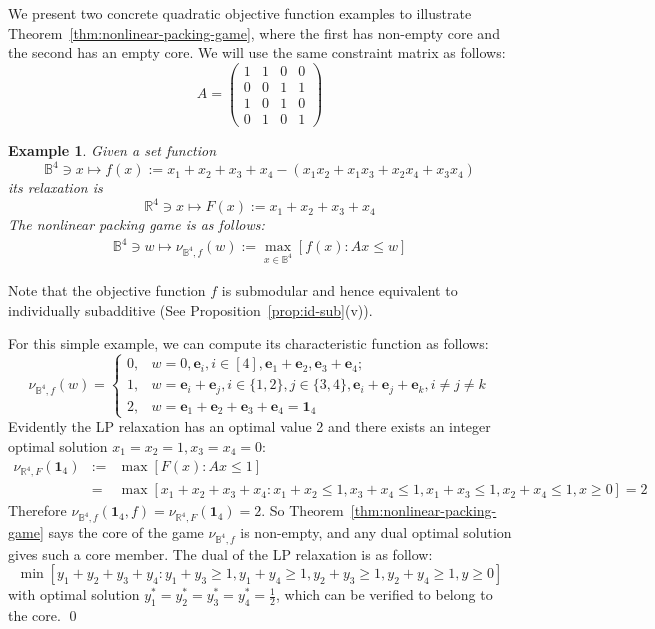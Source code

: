\documentclass[11pt]{article}\usepackage[]{graphicx}\usepackage[]{xcolor}
\newtheorem{example}{Example}
\begin{document}
We present two concrete quadratic objective function examples to illustrate Theorem~\ref{thm:nonlinear-packing-game}, where the first has non-empty core and the second has an empty core. We will use the same constraint matrix as follows:
\[
A=\begin{pmatrix}
1&1&0&0\\
0&0&1&1\\
1&0&1&0\\
0&1&0&1
\end{pmatrix}
\]
\begin{example} Given a set function
\[
\mathbb{B}^4\ni x\mapsto f(x):=x_1+x_2+x_3+x_4-(x_1x_2+x_1x_3+x_2x_4+x_3x_4)
\]
its relaxation is
\[
\mathbb{R}^4\ni x\mapsto F(x):=x_1+x_2+x_3+x_4
\]
The nonlinear packing game is as follows:
\begin{eqnarray*}
\mathbb{B}^4\ni w\mapsto \nu_{\mathbb{B}^4,f}(w):=\max_{x\in \mathbb{B}^4} [f(x): Ax\le w]
\end{eqnarray*}
\end{example}
Note that the objective function $f$ is submodular and hence equivalent to individually subadditive (See Proposition~\ref{prop:id-sub}(v)). 

For this simple example, we can compute its characteristic function as follows:
\[
\nu_{\mathbb{B}^4,f}(w)=
\begin{cases}
0, &w=0, \mathbf{e}_i, i\in [4], \mathbf{e}_1+\mathbf{e}_2, \mathbf{e}_3+\mathbf{e}_4;\\
1, & w= \mathbf{e}_i+\mathbf{e}_j, i\in \{1,2\}, j\in \{3,4\}, \mathbf{e}_i+\mathbf{e}_j+\mathbf{e}_k, i\ne j\ne k\\
2,  & w=\mathbf{e}_1+\mathbf{e}_2+\mathbf{e}_3+\mathbf{e}_4=\mathbf{1}_4
\end{cases}
\]
Evidently the LP relaxation has an optimal value 2 and there exists an integer optimal solution $x_1=x_2=1, x_3=x_4=0$:
\begin{eqnarray*}
\nu_{\mathbb{R}^4,F}\left(\mathbf{1}_4\right)&:=&\max [F(x): Ax\le 1]\\
&=&\max[x_1+x_2+x_3+x_4: x_1+x_2\le 1, x_3+x_4\le 1, x_1+x_3\le 1,  x_2+x_4\le 1, x\ge 0]=2
\end{eqnarray*}
Therefore $\nu_{\mathbb{B}^4,f}\left(\mathbf{1}_4,f\right)=\nu_{\mathbb{R}^4,F}\left(\mathbf{1}_4\right)=2$. So Theorem~\ref{thm:nonlinear-packing-game} says the core of the game $\nu_{\mathbb{B}^4,f}$ is non-empty, and any dual optimal solution gives such a core member. The dual of the LP relaxation is as follow:
\[
\min[y_1+y_2+y_3+y_4: y_1+y_3\ge 1, y_1+y_4\ge 1, y_2+y_3\ge 1, y_2+y_4\ge 1, y\ge 0] 
\]
with optimal solution $y^*_1=y^*_2=y^*_3=y^*_4=\frac{1}{2}$, which can be verified to belong to the core. \qed
\end{document}
